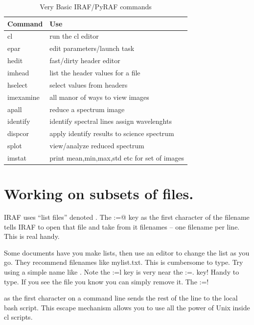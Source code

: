 \documentclass[letter,11pt,oneside]{article}
\makeatletter
\newcommand\llbox[1]{%
  \@tfor\@ii:=#1\do{%
    {\color{verbcolor}\Ovalbox{\strut\@ii}}%
  }%
}
\newcommand{\dhl}[1]{{\color{verbcolor}{\texttt#1}}}
\makeatother
\begin{document}
\begin{table}[h!]
\centering
\begin{tabular}{| l | l |}
\hline
Command  & Use   \\
\hline
cl            & run the cl editor                            \\
epar          & edit parameters/launch task                  \\
hedit         & fast/dirty header editor                     \\ 
imhead        & list the header values for a file            \\ 
hselect       & select values from headers                   \\ 
imexamine     & all manor of ways to view images             \\ 
apall         & reduce a spectrum image                      \\ 
identify      & identify spectral lines assign wavelenghts   \\
dispcor       & apply identify results to science spectrum   \\
splot         & view/analyze reduced spectrum                \\ 
imstat        & print mean,min,max,std etc for set of images \\ 
\hline
\end{tabular}
\caption{Very Basic IRAF/PyRAF commands}
\label{table:VeryBasicIRAF/PyRAFcommands}
\end{table}


\section{Working on subsets of files.}

IRAF uses ``list files'' denoted \dhl{@list.txt}. The \llbox{@} key
as the first character of the filename tells IRAF to open that
file and take from it filenames -- one filename per line. This is
real handy.

Some documents have you make lists, then use an editor to change the
list as you go. They recommend filenames like mylist.txt. This is
cumbersome to type. Try using a simple name like \dhl{l.l}. Note the
\llbox{l} key is very near the \llbox{.} key! Handy to type.  If you
see the file \dhl{l.l} you know you can simply remove it.  The \llbox{!}
as the first character on a command line sends the rest of the line
to the local bash script. This escape mechanism allows you to use
all the power of Unix inside cl scripts.
\end{document}
